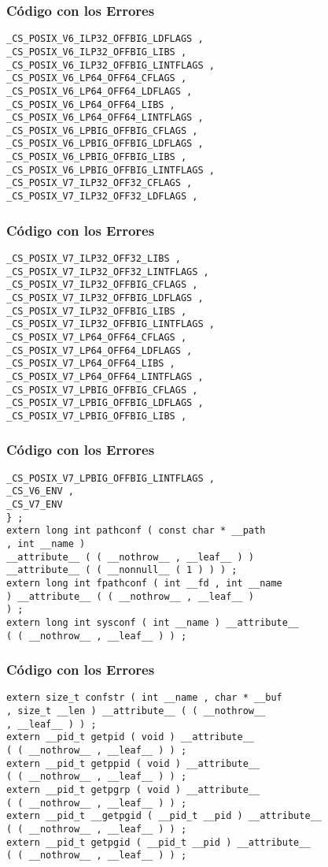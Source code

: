 \documentclass{beamer}
\begin{document}
\begin{frame}[fragile]
\frametitle{C\'odigo con los Errores}
\begin{verbatim}
_CS_POSIX_V6_ILP32_OFFBIG_LDFLAGS , 
_CS_POSIX_V6_ILP32_OFFBIG_LIBS , 
_CS_POSIX_V6_ILP32_OFFBIG_LINTFLAGS , 
_CS_POSIX_V6_LP64_OFF64_CFLAGS , 
_CS_POSIX_V6_LP64_OFF64_LDFLAGS , 
_CS_POSIX_V6_LP64_OFF64_LIBS , 
_CS_POSIX_V6_LP64_OFF64_LINTFLAGS , 
_CS_POSIX_V6_LPBIG_OFFBIG_CFLAGS , 
_CS_POSIX_V6_LPBIG_OFFBIG_LDFLAGS , 
_CS_POSIX_V6_LPBIG_OFFBIG_LIBS , 
_CS_POSIX_V6_LPBIG_OFFBIG_LINTFLAGS , 
_CS_POSIX_V7_ILP32_OFF32_CFLAGS , 
_CS_POSIX_V7_ILP32_OFF32_LDFLAGS , 
\end{verbatim}
\end{frame}
\begin{frame}[fragile]
\frametitle{C\'odigo con los Errores}
\begin{verbatim}
_CS_POSIX_V7_ILP32_OFF32_LIBS , 
_CS_POSIX_V7_ILP32_OFF32_LINTFLAGS , 
_CS_POSIX_V7_ILP32_OFFBIG_CFLAGS , 
_CS_POSIX_V7_ILP32_OFFBIG_LDFLAGS , 
_CS_POSIX_V7_ILP32_OFFBIG_LIBS , 
_CS_POSIX_V7_ILP32_OFFBIG_LINTFLAGS , 
_CS_POSIX_V7_LP64_OFF64_CFLAGS , 
_CS_POSIX_V7_LP64_OFF64_LDFLAGS , 
_CS_POSIX_V7_LP64_OFF64_LIBS , 
_CS_POSIX_V7_LP64_OFF64_LINTFLAGS , 
_CS_POSIX_V7_LPBIG_OFFBIG_CFLAGS , 
_CS_POSIX_V7_LPBIG_OFFBIG_LDFLAGS , 
_CS_POSIX_V7_LPBIG_OFFBIG_LIBS , 
\end{verbatim}
\end{frame}
\begin{frame}[fragile]
\frametitle{C\'odigo con los Errores}
\begin{verbatim}
_CS_POSIX_V7_LPBIG_OFFBIG_LINTFLAGS , 
_CS_V6_ENV , 
_CS_V7_ENV 
} ; 
extern long int pathconf ( const char * __path 
, int __name ) 
__attribute__ ( ( __nothrow__ , __leaf__ ) ) 
__attribute__ ( ( __nonnull__ ( 1 ) ) ) ; 
extern long int fpathconf ( int __fd , int __name 
) __attribute__ ( ( __nothrow__ , __leaf__ ) 
) ; 
extern long int sysconf ( int __name ) __attribute__ 
( ( __nothrow__ , __leaf__ ) ) ; 
\end{verbatim}
\end{frame}
\begin{frame}[fragile]
\frametitle{C\'odigo con los Errores}
\begin{verbatim}
extern size_t confstr ( int __name , char * __buf 
, size_t __len ) __attribute__ ( ( __nothrow__ 
, __leaf__ ) ) ; 
extern __pid_t getpid ( void ) __attribute__ 
( ( __nothrow__ , __leaf__ ) ) ; 
extern __pid_t getppid ( void ) __attribute__ 
( ( __nothrow__ , __leaf__ ) ) ; 
extern __pid_t getpgrp ( void ) __attribute__ 
( ( __nothrow__ , __leaf__ ) ) ; 
extern __pid_t __getpgid ( __pid_t __pid ) __attribute__ 
( ( __nothrow__ , __leaf__ ) ) ; 
extern __pid_t getpgid ( __pid_t __pid ) __attribute__ 
( ( __nothrow__ , __leaf__ ) ) ; 
\end{verbatim}
\end{frame}
\end{document}
